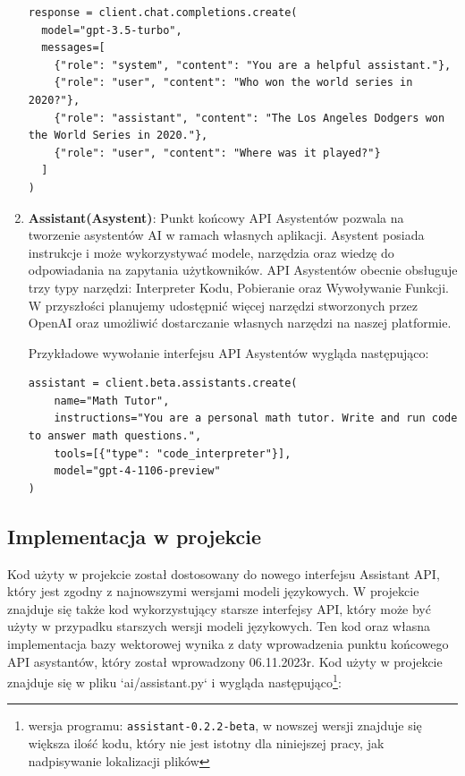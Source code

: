 \begin{enumerate}
\begin{listing}[H]
\begin{verbatim}
response = client.chat.completions.create(
  model="gpt-3.5-turbo",
  messages=[
    {"role": "system", "content": "You are a helpful assistant."},
    {"role": "user", "content": "Who won the world series in 2020?"},
    {"role": "assistant", "content": "The Los Angeles Dodgers won the World Series in 2020."},
    {"role": "user", "content": "Where was it played?"}
  ]
)
            \end{verbatim}
        \end{listing}
        \item \textbf{Assistant(Asystent)}: Punkt końcowy API Asystentów pozwala na tworzenie asystentów AI w ramach własnych aplikacji. Asystent posiada instrukcje i może wykorzystywać modele, narzędzia oraz wiedzę do odpowiadania na zapytania użytkowników. API Asystentów obecnie obsługuje trzy typy narzędzi: Interpreter Kodu, Pobieranie oraz Wywoływanie Funkcji. W przyszłości planujemy udostępnić więcej narzędzi stworzonych przez OpenAI oraz umożliwić dostarczanie własnych narzędzi na naszej platformie.
        
        Przykładowe wywołanie interfejsu API Asystentów wygląda następująco:
        \begin{listing}
            \begin{verbatim}
assistant = client.beta.assistants.create(
    name="Math Tutor",
    instructions="You are a personal math tutor. Write and run code to answer math questions.",
    tools=[{"type": "code_interpreter"}],
    model="gpt-4-1106-preview"
)
            \end{verbatim}
        \end{listing}
\end{enumerate}

\subsection{Implementacja w projekcie}
Kod użyty w projekcie został dostosowany do nowego interfejsu Assistant API, który jest zgodny z najnowszymi wersjami modeli językowych. W projekcie znajduje się także kod wykorzystujący starsze interfejsy API, który może być użyty w przypadku starszych wersji modeli językowych. Ten kod oraz własna implementacja bazy wektorowej wynika z daty wprowadzenia punktu końcowego API asystantów, który został wprowadzony 06.11.2023r.
Kod użyty w projekcie znajduje się w pliku `ai/assistant.py` i wygląda następująco\footnote{wersja programu: \texttt{assistant-0.2.2-beta}, w nowszej wersji znajduje się większa ilość kodu, który nie jest istotny dla niniejszej pracy, jak nadpisywanie lokalizacji plików}:

